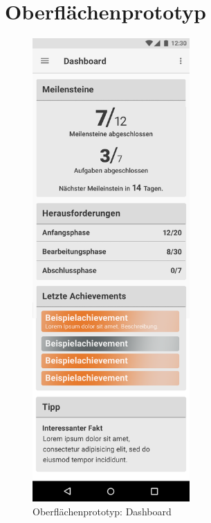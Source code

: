 \documentclass[bibliography=totoc,listof=totoc,BCOR=5mm,DIV=12,oneside]{scrbook}
\begin{document}
{


\section{Oberflächenprototyp}
\label{anhang:oberflaeche}
\begin{figure}[H]
	\centering
	\includegraphics[width=6cm]{Bilder/Prototyp/photoshop_screenshots/Dashboard.png}
\caption{Oberflächenprototyp: Dashboard}
\label{img:ptototypDashboard}
\end{figure}

}
\end{document}
